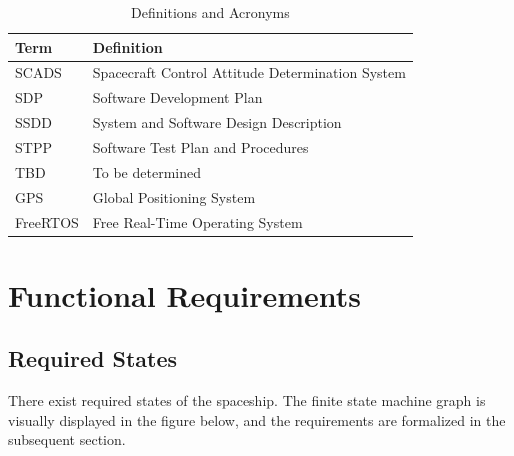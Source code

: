 \documentclass{article}
\begin{document}
        \begin{table}[H]
            \caption{Definitions and Acronyms}
            \vspace{4pt}
            \centering
            \renewcommand{\arraystretch}{1.4}
            \begin{tabular}{|l|p{14cm}|}
                \hline
                \textbf{Term} & \textbf{Definition} \\ \hline
                SCADS & Spacecraft Control Attitude Determination System \\ \hline
                SDP & Software Development Plan \\ \hline
                SSDD & System and Software Design Description \\ \hline
                STPP & Software Test Plan and Procedures \\ \hline
                TBD & To be determined \\ \hline
                GPS & Global Positioning System \\ \hline
                FreeRTOS & Free Real-Time Operating System \\ \hline
            \end{tabular}
        \end{table}


    \section{Functional Requirements}\label{sec:functional-requirements}

        \subsection{Required States}\label{sec:required-states}
            There exist required states of the spaceship. The finite state machine
            graph is visually displayed in the figure below, and the requirements
            are formalized in the subsequent section.
\end{document}
